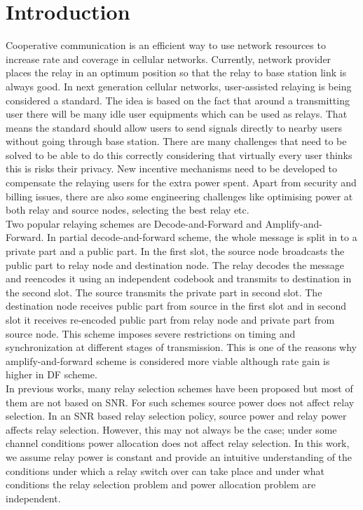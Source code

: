 \documentclass[conference]{IEEEtran}
\begin{document}
\section{Introduction}
Cooperative communication is an efficient way to use network 
resources to increase rate and coverage in cellular networks.
Currently, network provider places the relay in an optimum
position so that the relay to base station link is always good. 
In next generation cellular networks, user-assisted relaying is being 
considered a standard. The idea is based on the fact that around
a transmitting user there will be many idle user equipments which can 
 be used as relays. That means the standard should allow users to 
send signals directly to nearby users without going through base station.
There are many challenges that need to be solved to be able to do
this correctly considering that virtually every user thinks this is 
risks their privacy. New incentive mechanisms need to be developed 
to compensate the relaying users for the extra power spent. Apart from
security and billing issues, there are also some engineering challenges
like optimising power at both relay and source nodes, selecting the best relay 
etc. \\ 
Two popular relaying schemes are Decode-and-Forward and Amplify-and-Forward.
In partial decode-and-forward scheme, the whole message is split in to a private
part and a public part. In the first slot, the source node broadcasts the public
part to relay node and destination node. The relay decodes the message and reencodes
it using an independent codebook and transmits to destination in the second slot.
The source transmits the private part in second slot. The destination node 
receives public part from source in the first slot and in second slot it
receives re-encoded public part from relay node and private part from source node.
This scheme imposes severe restrictions on timing and synchronization at 
different stages of transmission. This is one of the reasons why amplify-and-forward
scheme is considered more viable although rate gain is higher in DF scheme. \\
In previous works, many relay selection schemes have been proposed but most 
of them are not based on SNR. For such schemes source power does not affect 
relay selection. In an SNR based relay selection policy, source
power and relay power affects relay selection. 
 However, this may not always be the case; 
under some channel conditions power allocation does not affect relay selection.
In this work, we assume relay power is constant and provide an intuitive
understanding of the conditions
under which a relay switch over can take place and under what conditions
the relay selection problem and power allocation problem are independent.
\end{document}
